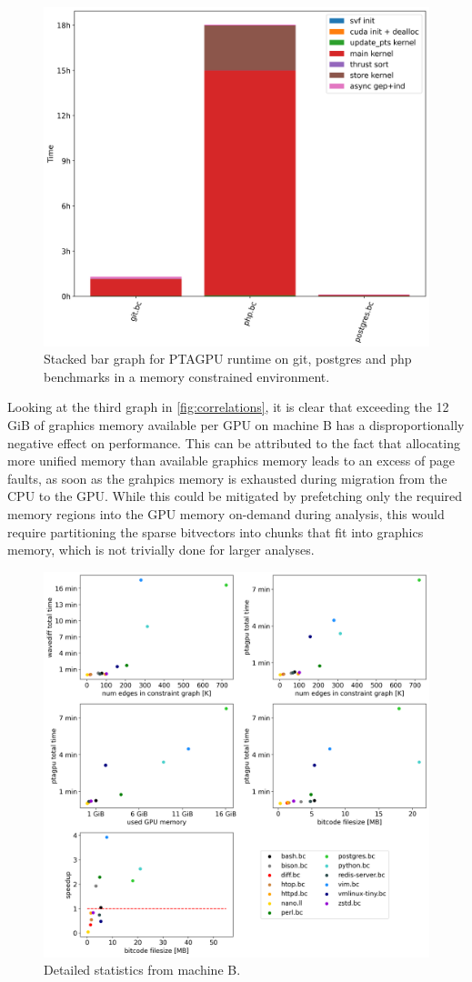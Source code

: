 \begin{figure}
    \centering
    \includegraphics[width=.6\textwidth]{img/stackedbar-problems.png}
    \caption[Stacked bar graph for PTAGPU runtime on git, postgres and php benchmarks.]{Stacked bar graph for PTAGPU runtime on git, postgres and php benchmarks in a memory constrained environment.}
    \label{fig:stackedbar-problem}
\end{figure}
Looking at the third graph in \autoref{fig:correlations}, it is clear that exceeding the 12 GiB of graphics memory available per GPU on machine B has a disproportionally negative effect on performance.
This can be attributed to the fact that allocating more unified memory than available graphics memory leads to an excess of page faults, as soon as the grahpics memory is exhausted during migration from the CPU to the GPU. 
While this could be mitigated by prefetching only the required memory regions into the GPU memory on-demand during analysis, this would require partitioning the sparse bitvectors into chunks that fit into graphics memory, which is not trivially done for larger analyses.
\begin{figure}
    \centering
    \includegraphics[width=.9\textwidth]{img/correlations.png}
    \caption{Detailed statistics from machine B.}
    \label{fig:correlations}
\end{figure}
